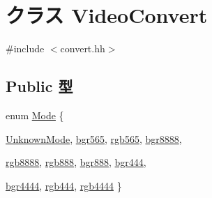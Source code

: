 \hypertarget{classVideoConvert}{
\section{クラス VideoConvert}
\label{classVideoConvert}
}


{\ttfamily \#include $<$convert.hh$>$}\subsection*{Public 型}
\begin{DoxyCompactItemize}
\item 
enum \hyperlink{classVideoConvert_a46c8a310cf4c094f8c80e1cb8dc1f911}{Mode} \{ \par
\hyperlink{classVideoConvert_a46c8a310cf4c094f8c80e1cb8dc1f911a1571db1c8961070764e78b186f02accc}{UnknownMode}, 
\hyperlink{classVideoConvert_a46c8a310cf4c094f8c80e1cb8dc1f911abf3a8ec336d9e06b07cb231a3991441c}{bgr565}, 
\hyperlink{classVideoConvert_a46c8a310cf4c094f8c80e1cb8dc1f911ae352c9d87052bb500ec805c2fdfdb6ab}{rgb565}, 
\hyperlink{classVideoConvert_a46c8a310cf4c094f8c80e1cb8dc1f911a9d27e4de1adadb32a97d8d5532ddf99a}{bgr8888}, 
\par
\hyperlink{classVideoConvert_a46c8a310cf4c094f8c80e1cb8dc1f911a02835285ca4c01833175d4821e5f596d}{rgb8888}, 
\hyperlink{classVideoConvert_a46c8a310cf4c094f8c80e1cb8dc1f911a4eb1b068342864c37b60cfa4728da415}{rgb888}, 
\hyperlink{classVideoConvert_a46c8a310cf4c094f8c80e1cb8dc1f911aa6dc036534a364e0490119210e280a9f}{bgr888}, 
\hyperlink{classVideoConvert_a46c8a310cf4c094f8c80e1cb8dc1f911adef81f9507ba23a59f78d3a66d4fcbd3}{bgr444}, 
\par
\hyperlink{classVideoConvert_a46c8a310cf4c094f8c80e1cb8dc1f911a19f4bb372d54959d60b4f0d693c2d555}{bgr4444}, 
\hyperlink{classVideoConvert_a46c8a310cf4c094f8c80e1cb8dc1f911ac7d63de6fd4bef930056e3b21453eaa0}{rgb444}, 
\hyperlink{classVideoConvert_a46c8a310cf4c094f8c80e1cb8dc1f911ac2b4516cfc895dd9b4f5ce26955633e4}{rgb4444}
 \}
\end{DoxyCompactItemize}
